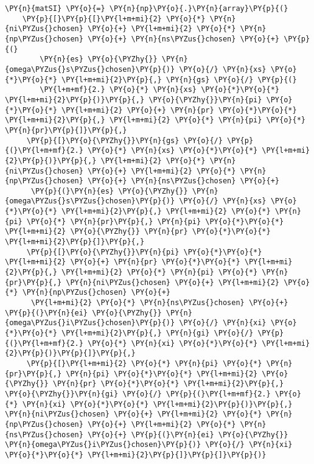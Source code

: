 \begin{Verbatim}[commandchars=\\\{\}]
\PY{n}{matSI} \PY{o}{=} \PY{n}{np}\PY{o}{.}\PY{n}{array}\PY{p}{(}
    \PY{p}{[}\PY{p}{[}\PY{l+m+mi}{2} \PY{o}{*} \PY{n}{ni\PYZus{}chosen} \PY{o}{+} \PY{l+m+mi}{2} \PY{o}{*} \PY{n}{np\PYZus{}chosen} \PY{o}{+} \PY{n}{ns\PYZus{}chosen} \PY{o}{+} \PY{p}{(}
        \PY{n}{es} \PY{o}{\PYZhy{}} \PY{n}{omega\PYZus{}s\PYZus{}chosen}\PY{p}{)} \PY{o}{/} \PY{n}{xs} \PY{o}{*}\PY{o}{*} \PY{l+m+mi}{2}\PY{p}{,} \PY{n}{gs} \PY{o}{/} \PY{p}{(}
        \PY{l+m+mf}{2.} \PY{o}{*} \PY{n}{xs} \PY{o}{*}\PY{o}{*} \PY{l+m+mi}{2}\PY{p}{)}\PY{p}{,} \PY{o}{\PYZhy{}}\PY{n}{pi} \PY{o}{*}\PY{o}{*} \PY{l+m+mi}{2} \PY{o}{+} \PY{n}{pr} \PY{o}{*}\PY{o}{*} \PY{l+m+mi}{2}\PY{p}{,} \PY{l+m+mi}{2} \PY{o}{*} \PY{n}{pi} \PY{o}{*} \PY{n}{pr}\PY{p}{]}\PY{p}{,}
     \PY{p}{[}\PY{o}{\PYZhy{}}\PY{n}{gs} \PY{o}{/} \PY{p}{(}\PY{l+m+mf}{2.} \PY{o}{*} \PY{n}{xs} \PY{o}{*}\PY{o}{*} \PY{l+m+mi}{2}\PY{p}{)}\PY{p}{,} \PY{l+m+mi}{2} \PY{o}{*} \PY{n}{ni\PYZus{}chosen} \PY{o}{+} \PY{l+m+mi}{2} \PY{o}{*} \PY{n}{np\PYZus{}chosen} \PY{o}{+} \PY{n}{ns\PYZus{}chosen} \PY{o}{+}
      \PY{p}{(}\PY{n}{es} \PY{o}{\PYZhy{}} \PY{n}{omega\PYZus{}s\PYZus{}chosen}\PY{p}{)} \PY{o}{/} \PY{n}{xs} \PY{o}{*}\PY{o}{*} \PY{l+m+mi}{2}\PY{p}{,} \PY{l+m+mi}{2} \PY{o}{*} \PY{n}{pi} \PY{o}{*} \PY{n}{pr}\PY{p}{,} \PY{n}{pi} \PY{o}{*}\PY{o}{*} \PY{l+m+mi}{2} \PY{o}{\PYZhy{}} \PY{n}{pr} \PY{o}{*}\PY{o}{*} \PY{l+m+mi}{2}\PY{p}{]}\PY{p}{,}
     \PY{p}{[}\PY{o}{\PYZhy{}}\PY{n}{pi} \PY{o}{*}\PY{o}{*} \PY{l+m+mi}{2} \PY{o}{+} \PY{n}{pr} \PY{o}{*}\PY{o}{*} \PY{l+m+mi}{2}\PY{p}{,} \PY{l+m+mi}{2} \PY{o}{*} \PY{n}{pi} \PY{o}{*} \PY{n}{pr}\PY{p}{,} \PY{n}{ni\PYZus{}chosen} \PY{o}{+} \PY{l+m+mi}{2} \PY{o}{*} \PY{n}{np\PYZus{}chosen} \PY{o}{+}
      \PY{l+m+mi}{2} \PY{o}{*} \PY{n}{ns\PYZus{}chosen} \PY{o}{+} \PY{p}{(}\PY{n}{ei} \PY{o}{\PYZhy{}} \PY{n}{omega\PYZus{}i\PYZus{}chosen}\PY{p}{)} \PY{o}{/} \PY{n}{xi} \PY{o}{*}\PY{o}{*} \PY{l+m+mi}{2}\PY{p}{,} \PY{n}{gi} \PY{o}{/} \PY{p}{(}\PY{l+m+mf}{2.} \PY{o}{*} \PY{n}{xi} \PY{o}{*}\PY{o}{*} \PY{l+m+mi}{2}\PY{p}{)}\PY{p}{]}\PY{p}{,}
     \PY{p}{[}\PY{l+m+mi}{2} \PY{o}{*} \PY{n}{pi} \PY{o}{*} \PY{n}{pr}\PY{p}{,} \PY{n}{pi} \PY{o}{*}\PY{o}{*} \PY{l+m+mi}{2} \PY{o}{\PYZhy{}} \PY{n}{pr} \PY{o}{*}\PY{o}{*} \PY{l+m+mi}{2}\PY{p}{,} \PY{o}{\PYZhy{}}\PY{n}{gi} \PY{o}{/} \PY{p}{(}\PY{l+m+mf}{2.} \PY{o}{*} \PY{n}{xi} \PY{o}{*}\PY{o}{*} \PY{l+m+mi}{2}\PY{p}{)}\PY{p}{,} \PY{n}{ni\PYZus{}chosen} \PY{o}{+} \PY{l+m+mi}{2} \PY{o}{*} \PY{n}{np\PYZus{}chosen} \PY{o}{+} \PY{l+m+mi}{2} \PY{o}{*} \PY{n}{ns\PYZus{}chosen} \PY{o}{+} \PY{p}{(}\PY{n}{ei} \PY{o}{\PYZhy{}} \PY{n}{omega\PYZus{}i\PYZus{}chosen}\PY{p}{)} \PY{o}{/} \PY{n}{xi} \PY{o}{*}\PY{o}{*} \PY{l+m+mi}{2}\PY{p}{]}\PY{p}{]}\PY{p}{)}



\end{Verbatim}
